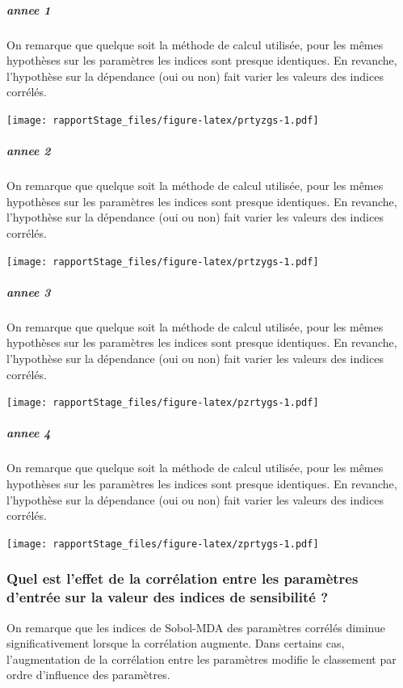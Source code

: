 \documentclass[
]{article}
\begin{document}
\hypertarget{annee-1-2}{%
\subparagraph{annee 1}\label{annee-1-2}}

On remarque que quelque soit la méthode de calcul utilisée, pour les
mêmes hypothèses sur les paramètres les indices sont presque identiques.
En revanche, l'hypothèse sur la dépendance (oui ou non) fait varier les
valeurs des indices corrélés.

\texttt{[image: rapportStage\_files/figure-latex/prtyzgs-1.pdf]}

\hypertarget{annee-2-2}{%
\subparagraph{annee 2}\label{annee-2-2}}

On remarque que quelque soit la méthode de calcul utilisée, pour les
mêmes hypothèses sur les paramètres les indices sont presque identiques.
En revanche, l'hypothèse sur la dépendance (oui ou non) fait varier les
valeurs des indices corrélés.

\texttt{[image: rapportStage\_files/figure-latex/prtzygs-1.pdf]}

\hypertarget{annee-3}{%
\subparagraph{annee 3}\label{annee-3}}

On remarque que quelque soit la méthode de calcul utilisée, pour les
mêmes hypothèses sur les paramètres les indices sont presque identiques.
En revanche, l'hypothèse sur la dépendance (oui ou non) fait varier les
valeurs des indices corrélés.

\texttt{[image: rapportStage\_files/figure-latex/pzrtygs-1.pdf]}

\hypertarget{annee-4}{%
\subparagraph{annee 4}\label{annee-4}}

On remarque que quelque soit la méthode de calcul utilisée, pour les
mêmes hypothèses sur les paramètres les indices sont presque identiques.
En revanche, l'hypothèse sur la dépendance (oui ou non) fait varier les
valeurs des indices corrélés.

\texttt{[image: rapportStage\_files/figure-latex/zprtygs-1.pdf]}

\hypertarget{quel-est-leffet-de-la-corruxe9lation-entre-les-paramuxe8tres-dentruxe9e-sur-la-valeur-des-indices-de-sensibilituxe9}{%
\subsubsection{Quel est l'effet de la corrélation entre les paramètres
d'entrée sur la valeur des indices de sensibilité
?}\label{quel-est-leffet-de-la-corruxe9lation-entre-les-paramuxe8tres-dentruxe9e-sur-la-valeur-des-indices-de-sensibilituxe9}}

On remarque que les indices de Sobol-MDA des paramètres corrélés diminue
significativement lorsque la corrélation augmente. Dans certains cas,
l'augmentation de la corrélation entre les paramètres modifie le
classement par ordre d'influence des paramètres.
\end{document}

